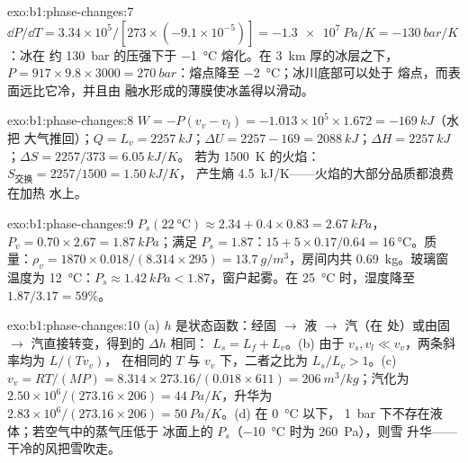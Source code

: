 \begin{solution}{exo:b1:phase-changes:7}
$\dd P/\dd T = 3.34 \times 10^5/[273 \times (-9.1 \times 10^{-5})] = \qty{-1.3e7}{Pa/K}
= \qty{-130}{bar/K}$：冰在
约 \qty{130}{bar} 的压强下于 \qty{-1}{\degreeCelsius} 熔化。在 \qty{3}{km} 厚的冰层之下，$P = 917 \times 9.8 \times 3000 =
\qty{270}{bar}$：熔点降至 \qty{-2}{\degreeCelsius}；冰川底部可以处于
熔点，而表面远比它冷，并且由
融水形成的薄膜使冰盖得以滑动。
\end{solution}

\begin{solution}{exo:b1:phase-changes:8}
$W = -P(v_v - v_l) = -1.013 \times 10^5 \times 1.672 = \qty{-169}{kJ}$（水把
大气推回）；$Q = L_v = \qty{2257}{kJ}$；$\Delta U = 2257 - 169
= \qty{2088}{kJ}$；$\Delta H = \qty{2257}{kJ}$；$\Delta S = 2257/373 = \qty{6.05}{kJ/K}$。
若为 \qty{1500}{K} 的火焰：$S_{\text{交换}} = 2257/1500 = \qty{1.50}{kJ/K}$，
产生熵 \qty{4.5}{kJ/K}——火焰的大部分品质都浪费在加热
水上。
\end{solution}

\begin{solution}{exo:b1:phase-changes:9}
$P_s(\qty{22}{\degreeCelsius}) \approx 2.34 + 0.4 \times 0.83 = \qty{2.67}{kPa}$，
$P_v = 0.70 \times 2.67 = \qty{1.87}{kPa}$；满足 $P_s = 1.87$：$15 +
5 \times 0.17/0.64 = \qty{16}{\degreeCelsius}$。质量：$\rho_v = 1870 \times 0.018/
(8.314 \times 295) = \qty{13.7}{g/m^3}$，房间内共 \qty{0.69}{kg}。玻璃窗温度为
\qty{12}{\degreeCelsius}：$P_s \approx \qty{1.42}{kPa} < 1.87$，窗户起雾。在
\qty{25}{\degreeCelsius} 时，湿度降至 $1.87/3.17 = 59\%$。
\end{solution}

\begin{solution}{exo:b1:phase-changes:10}
(a) $h$ 是状态函数：经固 $\to$ 液 $\to$ 汽（在
处）或由固 $\to$ 汽直接转变，得到的 $\Delta h$ 相同：
$L_s = L_f + L_v$。(b) 由于 $v_s, v_l \ll v_v$，两条斜率均为 $L/(Tv_v)$，
在相同的 $T$ 与 $v_v$ 下，二者之比为 $L_s/L_v > 1$。(c) $v_v = RT/(MP) =
8.314 \times 273.16/(0.018 \times 611) = \qty{206}{m^3/kg}$；汽化为
$2.50 \times 10^6/(273.16 \times 206) = \qty{44}{Pa/K}$，升华为 $2.83 \times 10^6/
(273.16 \times 206) = \qty{50}{Pa/K}$。(d) 在 \qty{0}{\degreeCelsius} 以下，
\qty{1}{bar} 下不存在液体；若空气中的蒸气压低于
冰面上的 $P_s$（\qty{-10}{\degreeCelsius} 时为 \qty{260}{Pa}），则雪
升华——干冷的风把雪吹走。
\end{solution}

